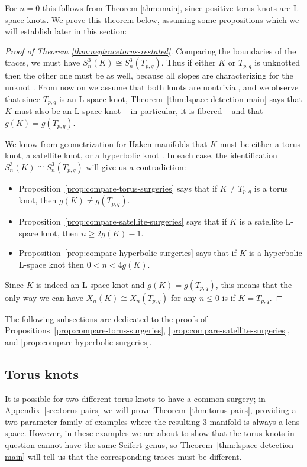 \documentclass[11pt]{amsart}
\numberwithin{equation}{section}
\numberwithin{theorem}{section}
\theoremstyle{definition}
\begin{document}
 For $n=0$ this follows from Theorem \ref{thm:main}, since positive torus knots are L-space knots. We  prove this theorem below, assuming some propositions which we will establish later in this section:


\begin{proof}[Proof of Theorem \ref{thm:negtracetorus-restated}]
Comparing the boundaries of the traces, we must have $S^3_n(K) \cong S^3_n(T_{p,q})$.  Thus if either $K$ or $T_{p,q}$ is unknotted then the other one must be as well, because all slopes are characterizing for the unknot \cite{kmos}.  From now on we assume that both knots are nontrivial, and we observe that since $T_{p,q}$ is an L-space knot, Theorem~\ref{thm:lspace-detection-main} says that $K$ must also be an L-space knot -- in particular, it is fibered \cite{ghiggini,ni-hfk} -- and that $g(K) = g(T_{p,q})$.

We know from geometrization for Haken manifolds that $K$ must be either a torus knot, a satellite knot, or a hyperbolic knot \cite[Corollary~2.5]{thurston-kleinian}.  In each case, the identification $S^3_n(K) \cong S^3_n(T_{p,q})$ will give us a contradiction:
\begin{itemize}
\item Proposition~\ref{prop:compare-torus-surgeries} says that if $K \neq T_{p,q}$ is a torus knot, then $g(K) \neq g(T_{p,q})$.
\item Proposition~\ref{prop:compare-satellite-surgeries} says that if $K$ is a satellite L-space knot, then $n \geq 2g(K)-1$.
\item Proposition~\ref{prop:compare-hyperbolic-surgeries} says that if $K$ is a hyperbolic L-space knot then $0 < n < 4g(K)$.
\end{itemize}
Since $K$ is indeed an L-space knot and $g(K) = g(T_{p,q})$, this means that the only way we can have $X_n(K) \cong X_n(T_{p,q})$ for any $n \leq 0$ is if $K = T_{p,q}$.
\end{proof}

The following subsections are dedicated to the proofs of Propositions~\ref{prop:compare-torus-surgeries}, \ref{prop:compare-satellite-surgeries}, and \ref{prop:compare-hyperbolic-surgeries}.

%
%
%

\subsection{Torus knots}

It is possible for two different torus knots to have a common surgery; in Appendix~\ref{sec:torus-pairs} we will prove Theorem~\ref{thm:torus-pairs}, providing a two-parameter family of examples where the resulting 3-manifold is always a lens space.  However, in these examples we are about to show that the torus knots in question cannot have the same Seifert genus, so Theorem~\ref{thm:lspace-detection-main} will tell us that the corresponding traces must be different.
\end{document}
